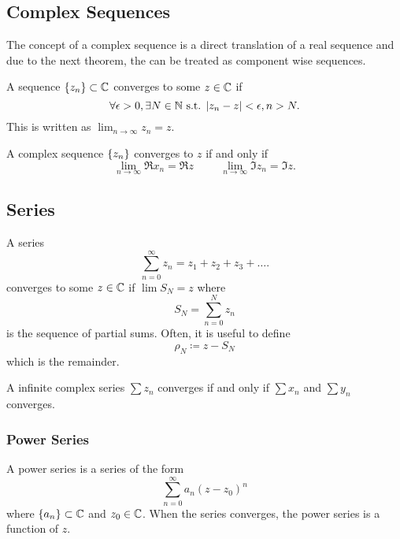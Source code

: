 \documentclass[../notes.tex]{subfiles}
\begin{document}

\subsection{Complex Sequences}

The concept of a complex sequence is a direct translation of a real sequence and due to the next theorem, the can be treated as component wise sequences.

\begin{definition}
    A sequence $\qty{z_n} \subset \mathbb{C}$ converges to some $z \in \mathbb{C}$ if
    \[
        \forall \epsilon > 0, \exists N \in \mathbb{N} \text{ s.t. } |z_n - z| < \epsilon, n > N
    .\]
    This is written as $\lim_{n\to \infty} z_n = z$.
\end{definition}

\begin{theorem}
    A complex sequence $\qty{z_n}$ converges to $z$ if and only if
    \[
        \lim_{n \to \infty} \Re{x_n} = \Re z \hspace{1cm} \lim_{n \to \infty} \Im{z_n} = \Im z
    .\]
\end{theorem}

\subsection{Series}

\begin{definition}
    A series
    \[
        \sum_{n = 0}^\infty z_n = z_1 + z_2 + z_3 + \ldots
    .\]
    converges to some $z \in \mathbb{C}$ if $\lim S_N = z$ where
    \[
        S_N = \sum_{n = 0}^N z_n
    \]
    is the sequence of partial sums. Often, it is useful to define
    \[
        \rho_N \coloneq z - S_N
    \]
    which is the remainder.
\end{definition}

\begin{theorem}
    A infinite complex series $\sum z_n$ converges if and only if $\sum x_n$ and $\sum y_n$ converges.
\end{theorem}

\subsubsection{Power Series}

\begin{definition}
    A power series is a series of the form
    \[
        \sum_{n = 0}^\infty a_n (z - z_0)^n
    \]
    where $\qty{a_n} \subset \mathbb{C}$ and $z_0 \in \mathbb{C}$. When the series converges, the power series is a function of $z$.
\end{definition}
\end{document}
